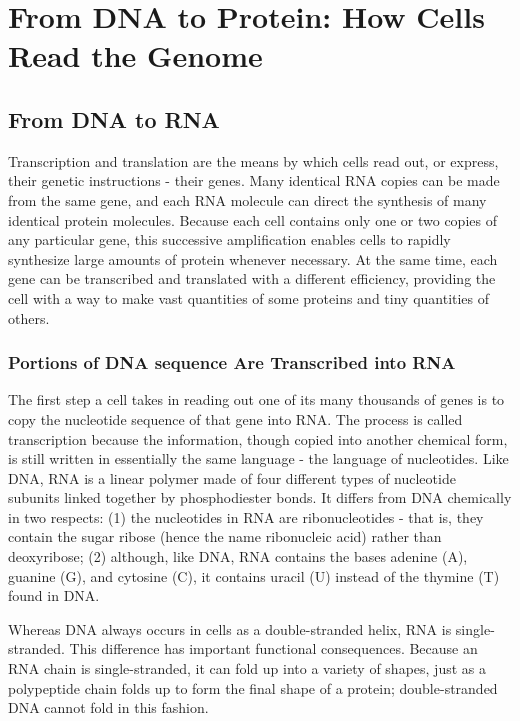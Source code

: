 \chapter{From DNA to Protein: How Cells Read the Genome}

\section{From DNA to RNA}

Transcription and translation are the means by which cells read out, or
express, their genetic instructions - their genes. Many identical RNA copies
can be made from the same gene, and each RNA molecule can direct
the synthesis of many identical protein molecules. Because each cell
contains only one or two copies of any particular gene, this successive
amplification enables cells to rapidly synthesize large amounts of protein
whenever necessary. At the same time, each gene can be transcribed
and translated with a different efficiency, providing the cell with a way
to make vast quantities of some proteins and tiny quantities of others.

\subsection{Portions of DNA sequence Are Transcribed into RNA}

The first step a cell takes in reading out one of its many thousands of
genes is to copy the nucleotide sequence of that gene into RNA. The process
is called transcription because the information, though copied into
another chemical form, is still written in essentially the same language -
the language of nucleotides. Like DNA, RNA is a linear polymer made of
four different types of nucleotide subunits linked together by phosphodiester
bonds. It differs from DNA chemically in two respects:
(1) the nucleotides in RNA are ribonucleotides - that is, they contain the
sugar ribose (hence the name ribonucleic acid) rather than deoxyribose;
(2) although, like DNA, RNA contains the bases adenine (A), guanine (G),
and cytosine (C), it contains uracil (U) instead of the thymine (T) found
in DNA.

Whereas DNA always occurs in cells as a
double-stranded helix, RNA is single-stranded. This difference has important
functional consequences. Because an RNA chain is single-stranded,
it can fold up into a variety of shapes, just as a polypeptide chain folds
up to form the final shape of a protein; double-stranded DNA cannot fold in this fashion.


